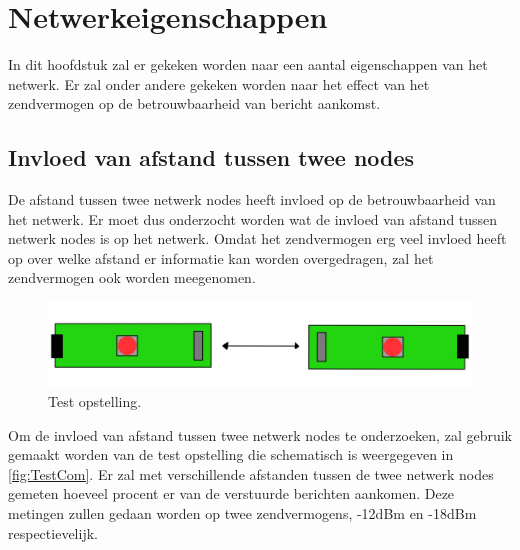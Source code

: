 \section{Netwerkeigenschappen}\label{sec:tests} \label{sec:tests}
In dit hoofdstuk zal er gekeken worden naar een aantal eigenschappen van het netwerk. Er zal onder andere gekeken worden naar het effect van het zendvermogen op de betrouwbaarheid van bericht aankomst.

\subsection{Invloed van afstand tussen twee nodes} \label{sec:influenceOfDistanceOnNetwork}
De afstand tussen twee netwerk nodes heeft invloed op de betrouwbaarheid van het netwerk. Er moet dus onderzocht worden wat de invloed van afstand tussen netwerk nodes is op het netwerk. Omdat het zendvermogen erg veel invloed heeft op over welke afstand er informatie kan worden overgedragen, zal het zendvermogen ook worden meegenomen.

\begin{figure}[h]
    \centering
    \includegraphics[scale = 0.3]{img/test1.png}
    \caption{Test opstelling.}
    \label{fig:TestCom}
\end{figure}
Om de invloed van afstand tussen twee netwerk nodes te onderzoeken, zal gebruik gemaakt worden van de test opstelling die schematisch is weergegeven in \autoref{fig:TestCom}. Er zal met verschillende afstanden tussen de twee netwerk nodes gemeten hoeveel procent er van de verstuurde berichten aankomen. Deze metingen zullen gedaan worden op twee zendvermogens, -12dBm en -18dBm respectievelijk.

